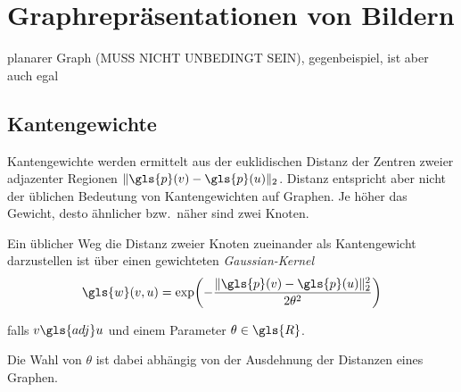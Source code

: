 \chapter{Graphrepräsentationen von Bildern}

planarer Graph (MUSS NICHT UNBEDINGT SEIN), gegenbeispiel, ist aber auch egal

\section{Kantengewichte}

Kantengewichte werden ermittelt aus der euklidischen Distanz der Zentren zweier adjazenter Regionen $\left\|\gls{p}\left(v\right) - \gls{p}\left(u\right)\right\|_2$.
Distanz entspricht aber nicht der üblichen Bedeutung von Kantengewichten auf Graphen.
Je höher das Gewicht, desto ähnlicher bzw.\ näher sind zwei Knoten.

Ein üblicher Weg die Distanz zweier Knoten zueinander als Kantengewicht darzustellen ist über einen gewichteten \emph{Gaussian-Kernel}~\cite{Shuman}
\begin{equation}
  \gls{w}\left(v, u\right) = \exp\left(-\frac{\left\|\gls{p}\left(v\right) - \gls{p}\left(u\right)\right\|_2^2}{2\theta^2}\right)
\end{equation}

falls $v \gls{adj} u$ und einem Parameter $\theta \in \gls{R}$.

Die Wahl von $\theta$ ist dabei abhängig von der Ausdehnung der Distanzen eines Graphen.

\begin{center}
\end{center}



